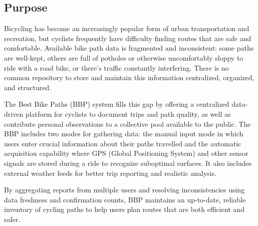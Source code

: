 

\subsection{Purpose}\label{sec:goals}

Bicycling has become an increasingly popular form of urban transportation and recreation, but cyclists frequently have difficulty finding routes that are safe and comfortable. Available bike path data is fragmented and inconsistent: some paths are well-kept, others are full of potholes or otherwise uncomfortably sloppy to ride with a road bike, or there's traffic constantly interfering. There is no common repository to store and maintain this information centralized, organized, and structured.

The Best Bike Paths (BBP) system fills this gap by offering a centralized data-driven platform for cyclists to document trips and path quality, as well as contribute personal observations to a collective pool available to the public. The BBP includes two modes for gathering data: the manual input mode in which users enter crucial information about their paths travelled and the automatic acquisition capability where GPS (Global Positioning System) and other sensor signals are stored during a ride to recognize suboptimal surfaces. It also includes external weather feeds for better trip reporting and realistic analysis.

By aggregating reports from multiple users and resolving inconsistencies using data freshness and confirmation counts, BBP maintains an up-to-date, reliable inventory of cycling paths to help users plan routes that are both efficient and safer.

